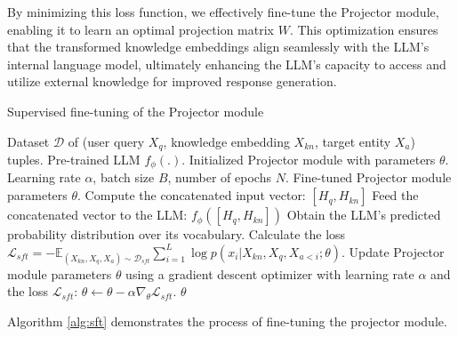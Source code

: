 By minimizing this loss function, we effectively fine-tune the Projector module, enabling it to learn an optimal projection matrix $W$. This optimization ensures that the transformed knowledge embeddings align seamlessly with the LLM's internal language model, ultimately enhancing the LLM's capacity to access and utilize external knowledge for improved response generation.

\begin{algorithm}[hbt]
\caption{Supervised fine-tuning of the Projector module}\label{alg:sft}
\begin{algorithmic}[1]
\REQUIRE Dataset $\mathcal{D}$ of (user query $X_q$, knowledge embedding $X_{kn}$, target entity $X_a$) tuples.
\REQUIRE Pre-trained LLM $f_\phi(.)$.
\REQUIRE Initialized Projector module with parameters $\theta$.
\REQUIRE Learning rate $\alpha$, batch size $B$, number of epochs $N$.
\ENSURE Fine-tuned Projector module parameters $\theta$.
\STATE Compute the concatenated input vector: $[H_q, H_{kn}]$
\STATE Feed the concatenated vector to the LLM: $f_\phi([H_q, H_{kn}])$
\STATE Obtain the LLM's predicted probability distribution over its vocabulary.
\STATE Calculate the loss $\mathcal{L}_{sft} = - \mathbb{E}_{(X_{kn},X_q,X_a) \sim \mathcal{D}_{sft}}\sum_{i=1}^{L} \log p(x_i | X_{kn}, X_q, X_{a<i}; \theta)$.
\STATE Update Projector module parameters $\theta$ using a gradient descent optimizer with learning rate $\alpha$ and the loss $\mathcal{L}_{sft}$: $\theta \leftarrow \theta - \alpha \nabla_\theta \mathcal{L}_{sft}$.
\ENDFOR
\ENDFOR
\RETURN $\theta$
\end{algorithmic}
\end{algorithm}
Algorithm \ref{alg:sft} demonstrates the process of fine-tuning the projector module.
